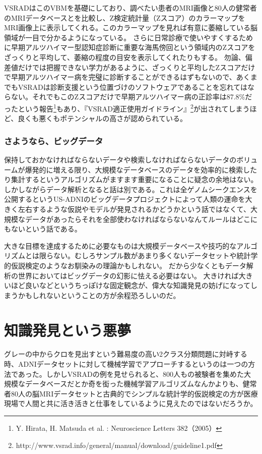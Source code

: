VSRADはこのVBMを基礎にしており、調べたい患者のMRI画像と80人の健常者のMRIデータベースとを比較し、Z検定統計量（Zスコア）のカラーマップをMRI画像上に表示してくれる。このカラーマップを見れば有意に萎縮している脳領域が一目で分かるようになっている。
さらに日常診療で使いやすくするために早期アルツハイマー型認知症診断に重要な海馬傍回という領域内のZスコアをざっくりと平均して、萎縮の程度の目安を表示してくれたりもする。
勿論、偏差値だけでは把握できない学力があるように、ざっくりと平均したZスコアだけで早期アルツハイマー病を完璧に診断することができるはずもないので、あくまでもVSRADは診断支援という位置づけのソフトウェアであることを忘れてはならない。それでもこのZスコアだけで早期アルツハイマー病の正診率は87.8\%だったという報告\footnote{Y. Hirata, H. Matsuda et al. : Neuroscience Letters 382（2005）}もあり、『VSRAD適正使用ガイドライン』\footnote{http://www.vsrad.info/general/manual/download/guideline1.pdf}が出されてしまうほど、良くも悪くもポテンシャルの高さが認められている。

\subsubsection{さようなら、ビッグデータ}
保持しておかなければならないデータや検索しなければならないデータのボリュームが爆発的に増える限り、大規模なデータベースのデータを効率的に検索したり集計するというアルゴリズムがますます重要になることに疑念の余地はない。
しかしながらデータ解析となると話は別である。これは全ゲノムシークエンスを公開するというUS-ADNIのビッグデータプロジェクトによって人類の運命を大きく左右するような仮説やモデルが発見されるかどうかという話ではなくて、大規模なデータがあったらそれを全部使わなければならないなんてルールはどこにもないという話である。

大きな目標を達成するために必要なものは大規模データベースや技巧的なアルゴリズムとは限らない。むしろサンプル数があまり多くないデータセットや統計学的仮説検定のようなお馴染みの理論かもしれない。
だから少なくともデータ解析の世界においてはビッグデータの幻影に怯える必要はない。
大きければ大きいほど良いなどというちっぽけな固定観念が、偉大な知識発見の妨げになってしまうかもしれないということの方が余程恐ろしいのだ。

\section{知識発見という悪夢}
グレーの中からクロを見出すという難易度の高い2クラス分類問題に対峙する時、ADNIデータセットに対して機械学習でアプローチするというのは一つの方法であった。しかしVSRADの例を見せられると、800人もの被験者を集めた大規模なデータベースだとか奇を衒った機械学習アルゴリズムなんかよりも、健常者80人の脳MRIデータセットと古典的でシンプルな統計学的仮説検定の方が医療現場で人間と共に活き活きと仕事をしているように見えたのではないだろうか。

